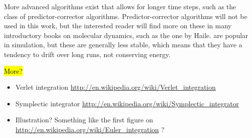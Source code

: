 \documentclass[11pt,bibliography=totoc,index=totoc]{scrbook}   %
\newcommand{\comment}[1]{\hl{#1}}
\begin{document}
More advanced algorithms exist that allows for longer time steps, such as the class of predictor-corrector algorithms.
Predictor-corrector algorithms will not be used in this work, but the interested reader will find more on these in many introductory books on molecular dynamics, such as the one by Haile\cite[158]{Haile:1992}.
are popular in simulation, but these are generally less stable, which means that they have a tendency to drift over long runs, not conserving energy.


\comment{More?}
\begin{itemize}
  \item 
Verlet integration
\url{http://en.wikipedia.org/wiki/Verlet_integration}
\item
Symplectic integrator
\url{http://en.wikipedia.org/wiki/Symplectic_integrator}
\item 
Illustration? Something like the first figure on
\url{http://en.wikipedia.org/wiki/Euler_integration} ?
\end{itemize}

%
\end{document}
